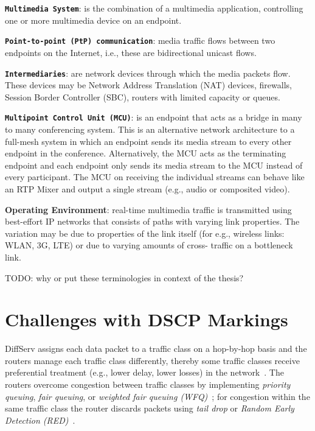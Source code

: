 \textbf{\texttt{Multimedia System}}: is the combination of a multimedia application,
controlling one or more multimedia device on an endpoint.

\textbf{\texttt{Point-to-point (PtP) communication}}: media traffic flows between two
endpoints on the Internet, i.e., these are bidirectional unicast flows.

\textbf{\texttt{Intermediaries}}: are network devices through which the media packets
flow. These devices may be Network Address Translation (NAT) devices,
firewalls, Session Border Controller (SBC), routers with limited capacity or
queues.

\textbf{\texttt{Multipoint Control Unit (MCU)}}: is an endpoint that acts as a bridge
in many to many conferencing system. This is an alternative network
architecture to a full-mesh system in which an endpoint sends its media stream
to every other endpoint in the conference. Alternatively, the MCU acts as the
terminating endpoint and each endpoint only sends its media stream  to the MCU
instead of every participant. The MCU on receiving the individual streams can
behave like an RTP Mixer and output a single stream (e.g., audio or composited
video).

\textbf{Operating Environment}: real-time multimedia traffic is
transmitted using best-effort IP networks that consists of paths with varying
link properties. The variation may be due to properties of the link itself
(for e.g., wireless links: WLAN, 3G, LTE) or due to varying amounts of cross-
traffic on a bottleneck link.

 {\color{red} TODO: why or put these terminologies in context of the thesis?}


\section{Challenges with DSCP Markings}
\label{rg.ch.dscp}

DiffServ assigns each data packet to a traffic class on a hop-by-hop basis and
the routers manage each traffic class differently, thereby some traffic
classes receive preferential treatment (e.g., lower delay, lower losses) in
the network~\cite{rfc2475}. The routers overcome congestion between traffic
classes by implementing \emph{priority queuing}, \emph{fair queuing}, or
\emph{weighted fair queuing (WFQ)}~\cite{rfc4594}; for congestion within the
same traffic class the router discards packets using \emph{tail drop} or
\emph{Random Early Detection (RED)}~\cite{Floyd:RED}.

